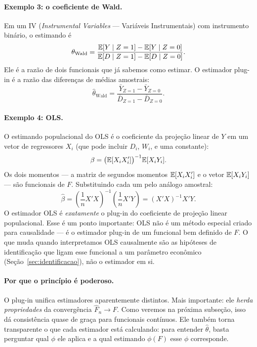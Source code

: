 \paragraph{Exemplo 3: o coeficiente de Wald.} Em um IV (\textit{Instrumental Variables} --- Variáveis Instrumentais) com instrumento binário, o estimando é
\[
\theta_{\text{Wald}} = \frac{\mathbb{E}[Y \mid Z=1] - \mathbb{E}[Y \mid Z=0]}{\mathbb{E}[D \mid Z=1] - \mathbb{E}[D \mid Z=0]}.
\]
Ele é a razão de dois funcionais que já sabemos como estimar. O estimador plug-in é a razão das diferenças de médias amostrais:
\begin{equation}
\hat{\theta}_{\text{Wald}} = \frac{\bar{Y}_{Z=1} - \bar{Y}_{Z=0}}{\bar{D}_{Z=1} - \bar{D}_{Z=0}}.
\label{eq:plug-in-wald}
\end{equation}

\paragraph{Exemplo 4: OLS.} O estimando populacional do OLS é o coeficiente da projeção linear de $Y$ em um vetor de regressores $X_i$ (que pode incluir $D_i$, $W_i$, e uma constante):
\[
\beta = \big(\mathbb{E}[X_i X_i']\big)^{-1} \mathbb{E}[X_i Y_i].
\]
Os dois momentos --- a matriz de segundos momentos $\mathbb{E}[X_i X_i']$ e o vetor $\mathbb{E}[X_i Y_i]$ --- são funcionais de $F$. Substituindo cada um pelo análogo amostral:
\begin{equation}
\hat{\beta} = \left(\frac{1}{n} X'X\right)^{-1} \left(\frac{1}{n} X'Y\right) = (X'X)^{-1} X'Y.
\label{eq:plug-in-ols}
\end{equation}
O estimador OLS é \textit{exatamente} o plug-in do coeficiente de projeção linear populacional. Esse é um ponto importante: OLS não é um método especial criado para causalidade --- é o estimador plug-in de um funcional bem definido de $F$. O que muda quando interpretamos OLS causalmente são as hipóteses de identificação que ligam esse funcional a um parâmetro econômico (Seção~\ref{sec:identificacao}), não o estimador em si.

\paragraph{Por que o princípio é poderoso.} O plug-in unifica estimadores aparentemente distintos. Mais importante: ele \textit{herda propriedades} da convergência $\hat{F}_n \to F$. Como veremos na próxima subseção, isso dá consistência quase de graça para funcionais contínuos. Ele também torna transparente o que cada estimador está calculando: para entender $\hat{\theta}$, basta perguntar qual $\phi$ ele aplica e a qual estimando $\phi(F)$ esse $\phi$ corresponde.


